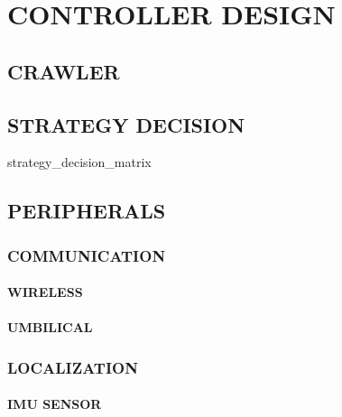 \chapter{CONTROLLER DESIGN}\label{chap:controller design}


\section{CRAWLER}




\section{STRATEGY DECISION}\label{sec:strategy decision}
{strategy_decision_matrix}


\section{PERIPHERALS}\label{sec:peripherals}

\subsection{COMMUNICATION}\label{sec:communication}

\subsubsection{WIRELESS}\label{sec:wireless}

\subsubsection{UMBILICAL}\label{sec:umbilical}


\subsection{LOCALIZATION}\label{sec:localization}

\subsubsection{IMU SENSOR}\label{sec:imu sensor}

